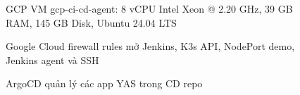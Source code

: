 \begin{figure}[H]
\centering
{}
\caption{GCP VM gcp-ci-cd-agent: 8 vCPU Intel Xeon @ 2.20 GHz, 39 GB RAM, 145 GB Disk, Ubuntu 24.04 LTS}
\end{figure}

\begin{figure}[H]
\centering
{}
\caption{Google Cloud firewall rules mở Jenkins, K3s API, NodePort demo, Jenkins agent và SSH}
\end{figure}

\begin{figure}[H]
\centering
{}
\caption{ArgoCD quản lý các app YAS trong CD repo}
\end{figure}
